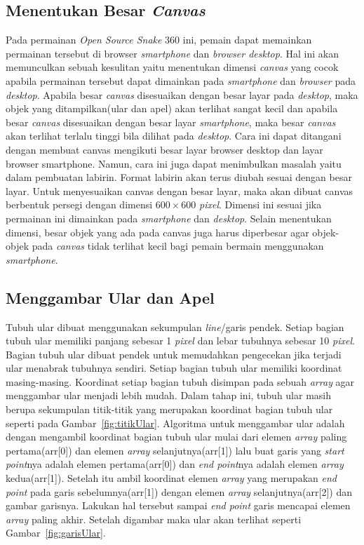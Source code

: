 \subsection{Menentukan Besar \textit{Canvas}}
Pada permainan \textit{Open Source Snake} 360 ini, pemain dapat memainkan permainan tersebut di browser \textit{smartphone} dan \textit{browser desktop}. Hal ini akan memunculkan sebuah kesulitan yaitu menentukan dimensi \textit{canvas} yang cocok apabila permainan tersebut dapat dimainkan pada \textit{smartphone} dan \textit{browser} pada \textit{desktop}. Apabila besar \textit{canvas} disesuaikan dengan besar layar pada \textit{desktop}, maka objek yang ditampilkan(ular dan apel) akan terlihat sangat kecil dan apabila besar \textit{canvas} disesuaikan dengan besar layar \textit{smartphone}, maka besar \textit{canvas} akan terlihat terlalu tinggi bila dilihat pada \textit{desktop}. Cara ini dapat ditangani dengan membuat canvas mengikuti besar layar browser desktop dan layar browser smartphone. Namun, cara ini juga dapat menimbulkan masalah yaitu dalam pembuatan labirin. Format labirin akan terus diubah sesuai dengan besar layar. Untuk menyesuaikan canvas dengan besar layar, maka akan dibuat canvas berbentuk persegi dengan dimensi $600 \times 600$ \textit{pixel}. Dimensi ini sesuai jika permainan ini dimainkan pada \textit{smartphone} dan \textit{desktop}. Selain menentukan dimensi, besar objek yang ada pada canvas juga harus diperbesar agar objek-objek pada \textit{canvas} tidak terlihat kecil bagi pemain bermain menggunakan \textit{smartphone}.

\subsection{Menggambar Ular dan Apel}
Tubuh ular dibuat menggunakan sekumpulan \textit{line}/garis pendek. Setiap bagian tubuh ular memiliki panjang sebesar 1 \textit{pixel} dan lebar tubuhnya sebesar 10 \textit{pixel}. Bagian tubuh ular dibuat pendek untuk memudahkan pengecekan jika terjadi ular menabrak tubuhnya sendiri. Setiap bagian tubuh ular memiliki koordinat masing-masing. Koordinat setiap bagian tubuh disimpan pada sebuah \textit{array} agar menggambar ular menjadi lebih mudah. Dalam tahap ini, tubuh ular masih berupa sekumpulan titik-titik yang merupakan koordinat bagian tubuh ular seperti pada Gambar~\ref{fig:titikUlar}. Algoritma untuk menggambar ular adalah dengan mengambil koordinat bagian tubuh ular mulai dari elemen \textit{array} paling pertama(arr[0]) dan elemen \textit{array} selanjutnya(arr[1]) lalu buat garis yang \textit{start point}nya adalah elemen pertama(arr[0]) dan \textit{end point}nya adalah elemen \textit{array} kedua(arr[1]). Setelah itu ambil koordinat elemen \textit{array} yang merupakan \textit{end point} pada garis sebelumnya(arr[1]) dengan elemen \textit{array} selanjutnya(arr[2]) dan gambar garisnya. Lakukan hal tersebut sampai \textit{end point} garis mencapai elemen \textit{array} paling akhir. Setelah digambar maka ular akan terlihat seperti Gambar~\ref{fig:garisUlar}.


